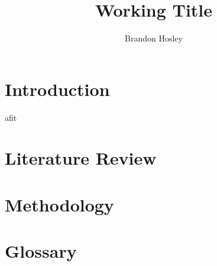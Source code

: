 \documentclass{afitthesis}
\title{ Working Title}
\author{Brandon Hosley}
\begin{document}
\maketitle %

\chapter{Introduction}

\gls{afit}

\chapter{Literature Review}


\chapter{Methodology}%
\label{ch:methodology}



\label{ch:results}%


\label{ch:conclusion}%


%
%


\appendix %

\chapter{Glossary}
\printglossaries%



\nocite{*} %
\clearpage{}%
\end{document}
